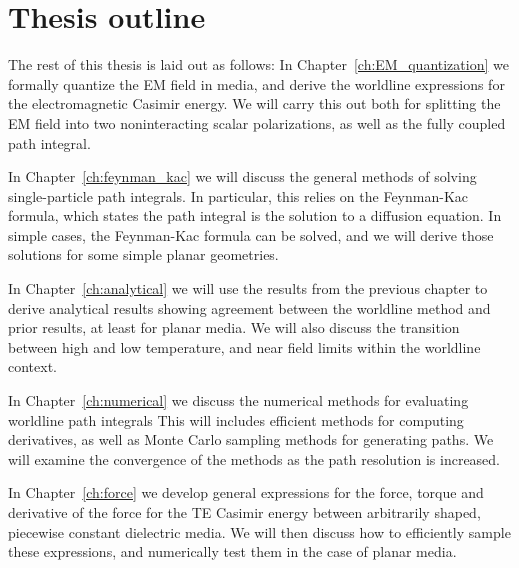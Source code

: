 \section{Thesis outline}

The rest of this thesis is laid out as follows: 
In Chapter~\ref{ch:EM_quantization} we formally quantize
the EM field in media, and derive the worldline expressions for the electromagnetic Casimir energy.
We will carry this out both for splitting the EM field into two noninteracting scalar polarizations,
as well as the fully coupled path integral.

In Chapter~\ref{ch:feynman_kac} we will discuss the general methods of solving single-particle path 
integrals.  In particular, this relies on the Feynman-Kac formula, which states the path integral
 is the solution to a diffusion equation.  In simple cases, the Feynman-Kac formula can be solved,
and we will derive those solutions for some simple planar geometries. 

In Chapter~\ref{ch:analytical} we will use the results from the previous chapter to derive analytical 
results showing agreement between the worldline method and prior results, at least for planar media.
We will also discuss the transition between high and low temperature, and near field limits within the
worldline context.  

In Chapter~\ref{ch:numerical} we discuss the numerical methods for evaluating worldline path integrals
This will includes efficient methods for computing derivatives, as well as Monte Carlo sampling methods
for generating paths.  We will examine the convergence of the methods as the path resolution is increased.

In Chapter~\ref{ch:force} we develop general expressions for the force, torque and derivative of the force 
for the TE Casimir energy between arbitrarily shaped, piecewise constant dielectric media.  
We will then discuss how to efficiently sample these expressions, and numerically test them in the case of planar media.  


